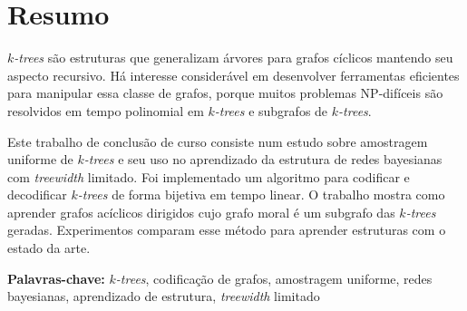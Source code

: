 \chapter*{Resumo}

\emph{$k$-trees} são estruturas que generalizam árvores para grafos cíclicos mantendo seu aspecto recursivo. Há interesse considerável em desenvolver ferramentas eficientes para manipular essa classe de grafos, porque muitos problemas NP-difíceis são resolvidos em tempo polinomial em \emph{$k$-trees} e subgrafos de \emph{$k$-trees}.

\vspace{1em}

\noindent Este trabalho de conclusão de curso consiste num estudo sobre amostragem uniforme de \emph{$k$-trees} e seu uso no aprendizado da estrutura de redes bayesianas com \emph{treewidth} limitado. Foi implementado um algoritmo para codificar e decodificar \emph{$k$-trees} de forma bijetiva em tempo linear. O trabalho mostra como aprender grafos acíclicos dirigidos cujo grafo moral é um subgrafo das \emph{$k$-trees} geradas. Experimentos comparam esse método para aprender estruturas com o estado da arte.

\vspace{1em}

\noindent \textbf{Palavras-chave:} \emph{$k$-trees}, codificação de grafos, amostragem uniforme, redes bayesianas, aprendizado de estrutura, \emph{treewidth} limitado
